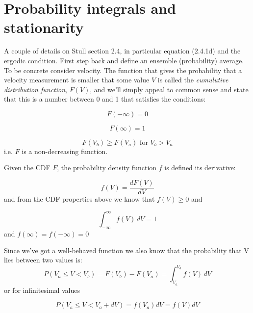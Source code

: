 \documentclass[12pt]{article}
\begin{document}
\pagestyle{first}


\section{Probability integrals and stationarity}
\label{sec:total-derivitive}

A couple of details on Stull section 2.4, in particular
equation (2.4.1d) and the ergodic condition.  First step back and define
an ensemble (probability) average.  To be concrete consider
velocity.  The function that gives the probability
that a velocity measurement is smaller that some value
$V$ is called the  \textit{cumulutive distribution function},
$F(V)$, and we'll simply appeal to common sense and
state that this is a number between 0 and 1 that satisfies the
conditions:

\begin{equation}
  \label{eq:one}
  F(-\infty) = 0
\end{equation}

\begin{equation}
  \label{eq:two}
  F(\infty) = 1
\end{equation}

\begin{equation}
  \label{eq:three}
  F(V_b) \geq F(V_a) \text{\ for\ }  V_b > V_a 
\end{equation}
i.e. $F$ is a non-decreasing function.

Given the CDF $F$, the probability density function $f$ is
defined its derivative:

\begin{equation}
  \label{eq:pdf}
  f(V) = \frac{dF(V) }{dV}
\end{equation}
and from the CDF properties above we know that $f(V) \ge 0$ and

\begin{equation}
  \label{eq:norm}
  \int_{ -\infty}^{\infty} f(V) \!\,dV = 1
\end{equation}
and $f(\infty)=f(-\infty)=0$

Since we've got a well-behaved function we also know that
the probability that V lies between two values is:
\begin{equation}
  P(V_a \le V < V_b) = F(V_b) - F(V_a) = \int_{V_a }^{V_b}f(V)\!\,dV
\end{equation}
or for infinitesimal values

\begin{equation}
  \label{eq:infintie}
  P(V_a  \le V < V_a + dV) = f(V_a) dV = f(V) dV
\end{equation}
\end{document}
